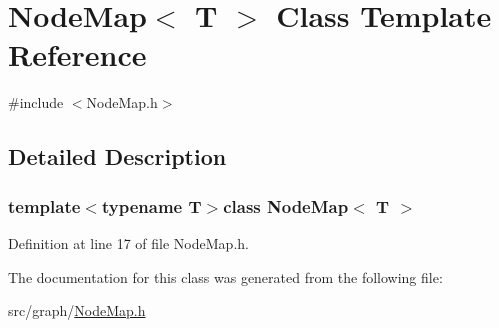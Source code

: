 \hypertarget{class_node_map}{\section{Node\-Map$<$ T $>$ Class Template Reference}
\label{class_node_map}
}


{\ttfamily \#include $<$Node\-Map.\-h$>$}



\subsection{Detailed Description}
\subsubsection*{template$<$typename T$>$class Node\-Map$<$ T $>$}



Definition at line 17 of file Node\-Map.\-h.



The documentation for this class was generated from the following file\-:\begin{DoxyCompactItemize}
\item 
src/graph/\hyperlink{_node_map_8h}{Node\-Map.\-h}\end{DoxyCompactItemize}
